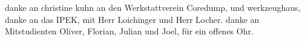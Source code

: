 danke an christine kuhn
an den Werkstattverein Coredump, und werkzeughaus,
danke an das IPEK, mit Herr Loichinger und Herr Locher.
danke an Mitstudienten Oliver, Florian, Julian und Joel, für ein offenes Ohr.
